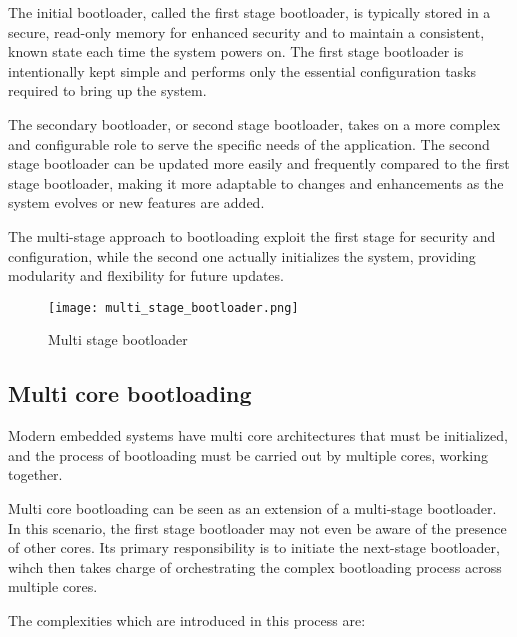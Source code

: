 The initial bootloader, called the first stage bootloader, is typically stored
in a secure, read-only memory for enhanced security and to maintain a
consistent, known state each time the system powers on.
The first stage bootloader is intentionally kept simple and performs only the
essential configuration tasks required to bring up the system.

The secondary bootloader, or second stage bootloader, takes on a more complex
and configurable role to serve the specific needs of the application.
The second stage bootloader can be updated more easily and frequently compared
to the first stage bootloader, making it more adaptable to changes and
enhancements as the system evolves or new features are added.

The multi-stage approach to bootloading exploit the first stage for security
and configuration, while the second one actually initializes the system,
providing modularity and flexibility for future updates.

\begin{figure}[ht]
    \centering
    \texttt{[image: multi\_stage\_bootloader.png]}
    \caption{Multi stage bootloader}
\end{figure}

\subsection{Multi core bootloading}

Modern embedded systems have multi core architectures that must be initialized,
and the process of bootloading must be carried out by multiple cores, working
together.

Multi core bootloading can be seen as an extension of a multi-stage bootloader.
In this scenario, the first stage bootloader may not even be aware of the
presence of other cores. Its primary responsibility is to initiate the
next-stage bootloader, wihch then takes charge of orchestrating the complex
bootloading process across multiple cores.

The complexities which are introduced in this process are:

